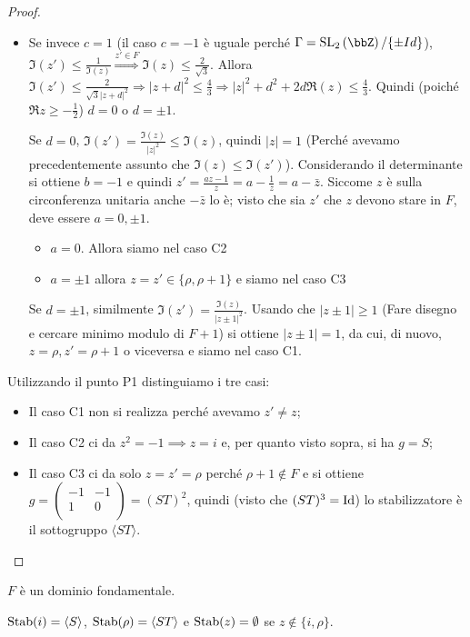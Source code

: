 \begin{proof}
\begin{itemize}
\item Se invece $c=1$ (il caso $c=-1$ è uguale perché
  $\Gamma=\SL_2 \left( \bbZ \right)/\{\pm Id\}$),
  $\Im(z') \leq \frac{1}{\Im(z)} \stackrel{z' \in F}{\Rightarrow} \Im(z) \leq \frac{2}{\sqrt{3}}$.
  Allora $\Im(z') \leq \frac{2}{\sqrt{3}|z+d|^2} \Rightarrow
  |z+d|^2 \leq \frac{4}{3} \Rightarrow |z|^2+d^2+2d \Re(z) \leq \frac{4}{3}$. 
  Quindi (poiché $\Re z \ge -\frac{1}{2}$) $d=0$ o $d=\pm 1$.

  Se $d=0$, $\Im(z') = \frac{\Im(z)}{|z|^2} \leq \Im(z)$, quindi $|z|=1$ (Perché avevamo precedentemente assunto che $\Im(z) \le \Im(z')$).
  Considerando il determinante si ottiene $b = -1$ e quindi $z' = \frac{az - 1}{z} = a - \frac{1}{z} = a - \bar{z}$. Siccome $z$ è sulla circonferenza unitaria anche $- \bar{z}$ lo è; visto che sia $z'$ che $z$ devono stare in $F$, deve essere $a = 0, \pm 1$.
  \begin{itemize}
  \item $a = 0$. Allora siamo nel caso C2
  \item $a = \pm 1$ allora $z = z' \in \{\rho, \rho + 1\}$ e siamo nel caso C3
  \end{itemize}

  Se $d=\pm 1$, similmente $\Im(z') = \frac{\Im(z)}{|z \pm 1|^2}$. Usando che $|z \pm 1| \ge 1$ (Fare disegno e cercare minimo modulo di $F + 1$)
  si ottiene $|z \pm 1|=1$, da cui, di nuovo, $z=\rho, z'=\rho + 1$ o viceversa e siamo nel caso C1.
\end{itemize}

\bigskip
{} Utilizzando il punto P1 distinguiamo i tre casi:
\begin{itemize}
\item Il caso C1 non si realizza perché avevamo $z' \neq z$;
\item Il caso C2 ci da $z^2 = -1 \implies z = i$ e, per quanto visto sopra, si ha $g = S$;
\item Il caso C3 ci da solo $z = z' = \rho$ perché $\rho + 1 \notin F$ e si ottiene $g = \left(\begin{array}{cc} -1 & -1 \\ 1 & 0 \\ \end{array} \right) = (ST)^2$, quindi (visto che $(ST)^3 = \text{Id}$) lo stabilizzatore è il sottogruppo $\langle ST \rangle$.
\end{itemize}
\end{proof}

\begin{corollario}
$F$ è un dominio fondamentale.

$\text{Stab}(i)=\left\langle S \right\rangle$, 
$\text{Stab}(\rho)=\left\langle ST \right\rangle$ e $\text{Stab}(z)=\emptyset$ se 
$z \notin \{i, \rho \}$.
\end{corollario}

